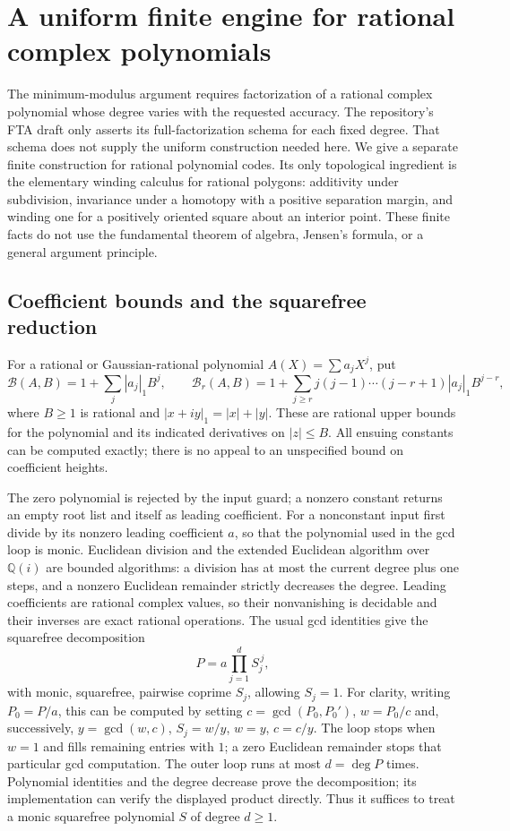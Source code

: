 \section{A uniform finite engine for rational complex polynomials}
\label{sec:polynomial-algebra}

The minimum-modulus argument requires factorization of a rational complex
polynomial whose degree varies with the requested accuracy. The repository's
FTA draft only asserts its full-factorization schema for each fixed degree.
That schema does not supply the uniform construction needed here. We give a
separate finite construction for rational polynomial codes. Its only
topological ingredient is the elementary winding calculus for rational
polygons: additivity under subdivision, invariance under a homotopy with a
positive separation margin, and winding one for a positively oriented square
about an interior point. These finite facts do not use the fundamental
theorem of algebra, Jensen's formula, or a general argument principle.

\subsection{Coefficient bounds and the squarefree reduction}

For a rational or Gaussian-rational polynomial $A(X)=\sum a_jX^j$, put
\[
 \mathcal B(A,B)=1+\sum_j |a_j|_1B^j,\qquad
 \mathcal B_r(A,B)=1+\sum_{j\ge r}
       j(j-1)\cdots(j-r+1)|a_j|_1B^{j-r},
\]
where $B\ge1$ is rational and $|x+iy|_1=|x|+|y|$.
These are rational upper bounds for the polynomial and its indicated
derivatives on $|z|\le B$. All ensuing constants can be computed exactly;
there is no appeal to an unspecified bound on coefficient heights.

The zero polynomial is rejected by the input guard; a nonzero constant
returns an empty root list and itself as leading coefficient. For a
nonconstant input first divide by its nonzero leading coefficient $a$,
so that the polynomial used in the gcd loop is monic.
Euclidean division and the extended Euclidean algorithm over $\mathbb Q(i)$
are bounded algorithms: a division has at most the current degree plus one
steps, and a nonzero Euclidean remainder strictly decreases the degree.
Leading coefficients are rational complex values, so their nonvanishing is
decidable and their inverses are exact rational operations. The usual gcd
identities give the squarefree decomposition
\[
                  P=a\prod_{j=1}^{d}S_j^{\,j},
\]
with monic, squarefree, pairwise coprime $S_j$, allowing $S_j=1$.
For clarity, writing $P_0=P/a$, this can be computed by setting
$c=\gcd(P_0,P_0')$, $w=P_0/c$ and,
successively, $y=\gcd(w,c)$, $S_j=w/y$, $w=y$, $c=c/y$.
The loop stops when $w=1$ and fills remaining entries with $1$; a zero
Euclidean remainder stops that particular gcd computation. The outer
loop runs at most $d=\deg P$ times. Polynomial identities and the
degree decrease prove the decomposition; its implementation can verify the
displayed product directly. Thus it suffices to treat a monic squarefree
polynomial $S$ of degree $d\ge1$.

